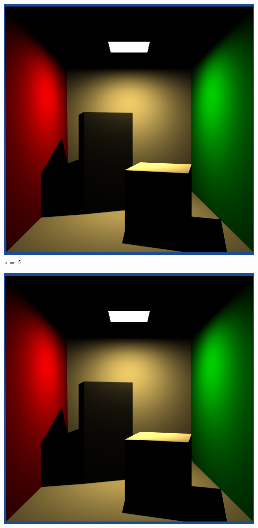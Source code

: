 \documentclass[a4,12pt]{article}
\begin{document}
	\begin{center}
		\begin{minipage}[b]{0.40\linewidth}
			\begin{center}
				\includegraphics[width = \textwidth]{./Worksheet6/cornellblocks5.png}\\
				\textit{s = 5}
			\end{center}
		\end{minipage}
		\hspace{0.05\linewidth}
		\begin{minipage}[b]{0.40\linewidth}
			\begin{center}
				\includegraphics[width = \textwidth]{./Worksheet6/cornellblocks6.png}\\

\end{center}
\end{minipage}
\end{center}
\end{document}
